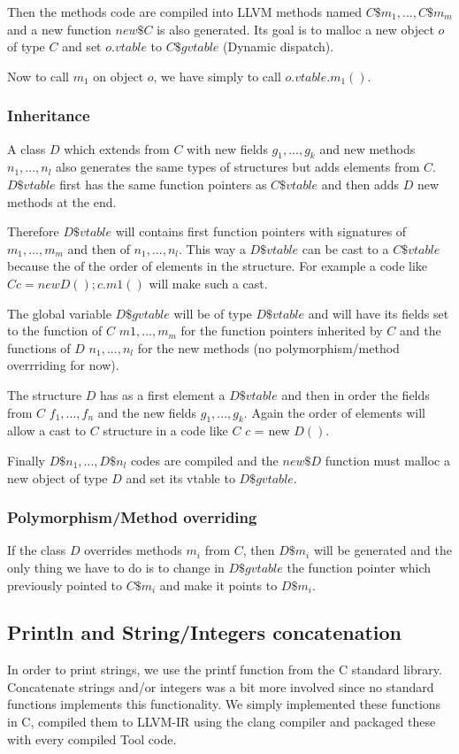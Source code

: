 Then the methods code are compiled into LLVM methods named $C\$m_1, ..., C\$m_m$ and a new function $new\$C$ is also generated. Its goal is to malloc a new object $o$ of type $C$ and  set $o.vtable$ to $C\$gvtable$ (Dynamic dispatch).

Now to call $m_1$ on object $o$, we have simply to call $o.vtable.m_1()$.

\subsubsection{Inheritance}
A class $D$ which extends from $C$ with new fields $g_1, ..., g_k$ and new methods $n_1, ..., n_l$ also generates the same types of structures but adds elements from $C$. $D\$vtable$ first has the same function pointers as $C\$vtable$ and then adds $D$ new methods at the end.

 Therefore $D\$vtable$ will contains first function pointers with signatures of $m_1, ..., m_m$ and then of $n_1, ..., n_l$. This way a $D\$vtable$ can be cast to a $C\$vtable$ because the of the order of elements in the structure. For example a code like $C c = new D(); c.m1()$ will make such a cast.

The global variable $D\$gvtable$ will be of type $D\$vtable$ and will have its fields set to the function of $C$ $m1, ..., m_m$ for the function pointers inherited by $C$ and the functions of $D$ $n_1, ..., n_l$ for the new methods (no polymorphism/method overrriding for now).

The structure $D$ has as a first element a $D\$vtable$ and then in order the fields from $C$ $f_1, ..., f_n$ and the new fields $g_1, ..., g_k$. Again the order of elements will allow a cast to $C$ structure in a code like $C$ $c$ = new $D()$.

Finally $D\$n_1, ..., D\$n_l$ codes are compiled and the $new\$D$ function must malloc a new object of type $D$ and set its vtable to $D\$gvtable$.

\subsubsection{Polymorphism/Method overriding}
If the class $D$ overrides methods $m_i$ from $C$, then $D\$m_i$ will be generated and the only thing we have to do is to change in $D\$gvtable$ the function pointer which previously pointed to $C\$m_i$ and make it points to $D\$m_i$.

\subsection{Println and String/Integers concatenation}
In order to print strings, we use the printf function from the C standard library. Concatenate strings and/or integers was a bit more involved since no standard functions implements this functionality. We simply implemented these functions in C, compiled them to LLVM-IR using the clang compiler and packaged these with every compiled Tool code.

